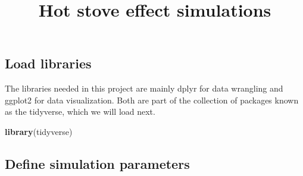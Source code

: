 \documentclass[
]{article}
\title{Hot stove effect simulations}
\author{}
\date{\vspace{-2.5em}}
\newenvironment{Shaded}{\begin{snugshade}}{\end{snugshade}}
\newcommand{\FunctionTok}[1]{\textcolor[rgb]{0.13,0.29,0.53}{\textbf{#1}}}
\newcommand{\NormalTok}[1]{#1}
\begin{document}
\maketitle

\subsection{Load libraries}\label{load-libraries}

The libraries needed in this project are mainly dplyr for data wrangling
and ggplot2 for data visualization. Both are part of the collection of
packages known as the tidyverse, which we will load next.

\begin{Shaded}
\begin{Highlighting}[]
\FunctionTok{library}\NormalTok{(tidyverse)}
\end{Highlighting}
\end{Shaded}

\subsection{Define simulation
parameters}\label{define-simulation-parameters}
\end{document}
